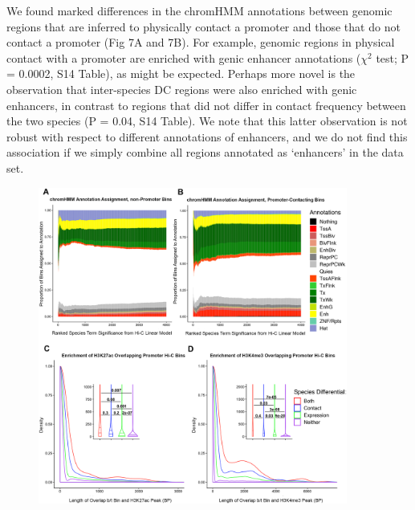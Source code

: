 We found marked differences in the chromHMM annotations between genomic regions that are inferred to physically contact a promoter and those that do not contact a promoter (Fig 7A and 7B). For example, genomic regions in physical contact with a promoter are enriched with genic enhancer annotations ($\chi^2$ test; P = 0.0002, S14 Table), as might be expected. Perhaps more novel is the observation that inter-species DC regions were also enriched with genic enhancers, in contrast to regions that did not differ in contact frequency between the two species (P = 0.04, S14 Table). We note that this latter observation is not robust with respect to different annotations of enhancers, and we do not find this association if we simply combine all regions annotated as `enhancers' in the data set.

\begin{figure}
\centering
\includegraphics[width=4in]{img/fig7.PNG}

\end{figure}
